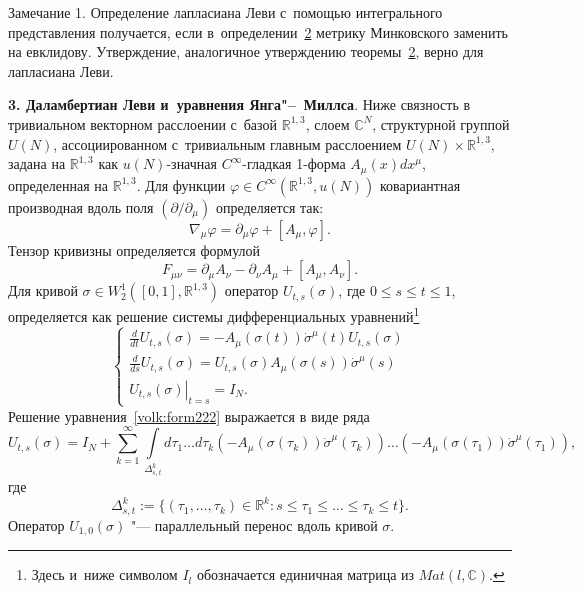 \smallskip

{\small \sc Замечание 1}. {Определение лапласиана Леви с~помощью интегрального представления получается, если в~определении~\hyperlink{volk:def2}{2} метрику Минковского заменить на евклидову. 
Утверждение,  аналогичное утверждению теоремы~\hyperlink{volk:th2}{2}, верно для лапласиана Леви.
}


\smallskip



{\bf 3. Даламбертиан Леви и~уравнения Янга"--~Миллса}.
 Ниже связность в тривиальном векторном расслоении с~базой $\mathbb{R}^{1, 3}$, слоем $\mathbb{C}^N$, структурной группой $U(N)$, ассоциированном с~тривиальным главным расслоением $U(N)\times \mathbb{R}^{1,3}$, задана на $\mathbb{R}^{1,3}$ как $u(N)$-значная $C^\infty$-гладкая 1-форма $A_\mu(x)dx^\mu$, определенная на  $\mathbb{R}^{1,3}$. Для функции $\varphi\in C^\infty(\mathbb{R}^{1,3},u(N))$ ковариантная  производная вдоль поля $({\partial}/{\partial_\mu})$ определяется так:
 $$\nabla_\mu \varphi=\partial_\mu \varphi+[A_\mu,\varphi].$$
 Тензор кривизны определяется формулой $$F_{\mu\nu}=\partial_\mu A_\nu-\partial_\nu A_\mu+[A_\mu,A_\nu].$$ %
 Для кривой $\sigma\in W^1_2([0, 1],\mathbb{R}^{1,3})$  оператор $U_{t,s}(\sigma)$, где $0\leq s\leq t \leq1$, определяется как решение системы дифференциальных уравнений\footnote{Здесь и~ниже символом $I_l$ обозначается единичная  матрица из $Mat(l,\mathbb{C})$.}
 \begin{equation}
\label{volk:form222}
 \left\{
\begin{aligned}
\frac
{d}{dt}U_{t,s}(\sigma)=-A_{\mu}(\sigma(t))\dot{\sigma}^{\mu}(t) U_{t,s}(\sigma)\\
\frac
d{ds}U_{t,s}(\sigma)=U_{t,s}(\sigma)A_{\mu}(\sigma(s))\dot{\sigma}^{\mu}(s)\\
\left.U_{t,s}(\sigma)\right|_{t=s}=I_N.
\end{aligned}
\right.
\end{equation}
Решение уравнения~\eqref{volk:form222} выражается в виде ряда
$$U_{t,s}(\sigma)=I_N+\sum_{k=1}^\infty\int\limits_{\Delta_{s,t}^k}d\tau_1\ldots d\tau_k
\left(-A_\mu(\sigma(\tau_k))\dot{\sigma}^\mu(\tau_k)\right)\ldots
\left(-A_\mu(\sigma(\tau_1))\dot{\sigma}^\mu(\tau_1)\right),$$
где 
$$ \Delta_{s,t}^k:= \bigl\{(\tau_1,\ldots,\tau_k)\in\mathbb{R}^k: s \leq
\tau_1\leq \ldots \leq \tau_k \leq t \bigr\}.$$ 
Оператор $U_{1, 0}(\sigma)$ "--- параллельный перенос вдоль кривой $\sigma$.

